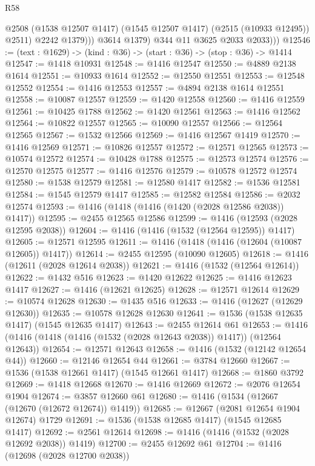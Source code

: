 \begin{lexlean}{R58}
\begin{coremodule}
{{                  @2508 (@1538 @12507 @1417) (@1545 @12507 @1417) (@2515 (@10933 @12495)) @2511)
                  @2242
                  @1379)))
            @3614
            @1379)
          @344
          @11
          @3625
          @2033
          @2033)))
@12546 := (text : @1629) -> (kind : @36) -> (start : @36) -> (stop : @36) -> @1414
@12547 := @1418 @10931
@12548 := @1416 @12547
@12550 := @4889 @2138 @1614
@12551 := @10933 @1614
@12552 := @12550 @12551
@12553 := @12548 @12552
@12554 := @1416 @12553
@12557 := @4894 @2138 @1614 @12551
@12558 := @10087 @12557
@12559 := @1420 @12558
@12560 := @1416 @12559
@12561 := @10425 @1788
@12562 := @1420 @12561
@12563 := @1416 @12562
@12564 := @10822 @12557
@12565 := @10090 @12557
@12566 := @12564 @12565
@12567 := @1532 @12566
@12569 := @1416 @12567 @1419
@12570 := @1416 @12569
@12571 := @10826 @12557
@12572 := @12571 @12565
@12573 := @10574 @12572
@12574 := @10428 @1788
@12575 := @12573 @12574
@12576 := @12570 @12575
@12577 := @1416 @12576
@12579 := @10578 @12572 @12574
@12580 := @1538 @12579
@12581 := @12580 @1417
@12582 := @1536 @12581
@12584 := @1545 @12579 @1417
@12585 := @12582 @12584
@12586 := @2032 @12574
@12593 := @1416 (@1418 (@1416 (@1420 (@2028 @12586 @2038)) @1417))
@12595 := @2455 @12565 @12586
@12599 := @1416 (@12593 (@2028 @12595 @2038))
@12604 := @1416 (@1416 (@1532 (@12564 @12595)) @1417)
@12605 := @12571 @12595
@12611 := @1416 (@1418 (@1416 (@12604 (@10087 @12605)) @1417))
@12614 := @2455 @12595 (@10090 @12605)
@12618 := @1416 (@12611 (@2028 @12614 @2038))
@12621 := @1416 (@1532 (@12564 @12614))
@12622 := @1432 @516
@12623 := @1420 @12622
@12625 := @1416 @12623 @1417
@12627 := @1416 (@12621 @12625)
@12628 := @12571 @12614
@12629 := @10574 @12628
@12630 := @1435 @516
@12633 := @1416 (@12627 (@12629 @12630))
@12635 := @10578 @12628 @12630
@12641 := @1536 (@1538 @12635 @1417) (@1545 @12635 @1417)
@12643 := @2455 @12614 @61
@12653 := @1416 (@1416 (@1418 (@1416 (@1532 (@2028 @12643 @2038)) @1417)) (@12564 @12643))
@12654 := @12571 @12643
@12658 := @1416 (@1532 (@12142 @12654 @44))
@12660 := @12146 @12654 @44
@12661 := @3784 @12660
@12667 := @1536 (@1538 @12661 @1417) (@1545 @12661 @1417)
@12668 := @1860 @3792
@12669 := @1418 @12668
@12670 := @1416 @12669
@12672 := @2076 @12654 @1904
@12674 := @3857 @12660 @61
@12680 := @1416 (@1534 (@12667 (@12670 (@12672 @12674)) @1419))
@12685 := @12667 (@2081 @12654 @1904 @12674) @1729
@12691 := @1536 (@1538 @12685 @1417) (@1545 @12685 @1417)
@12692 := @2561 @12614
@12698 := @1416 (@1416 (@1532 (@2028 @12692 @2038)) @1419)
@12700 := @2455 @12692 @61
@12704 := @1416 (@12698 (@2028 @12700 @2038))
}}
\end{coremodule}
\end{lexlean}
